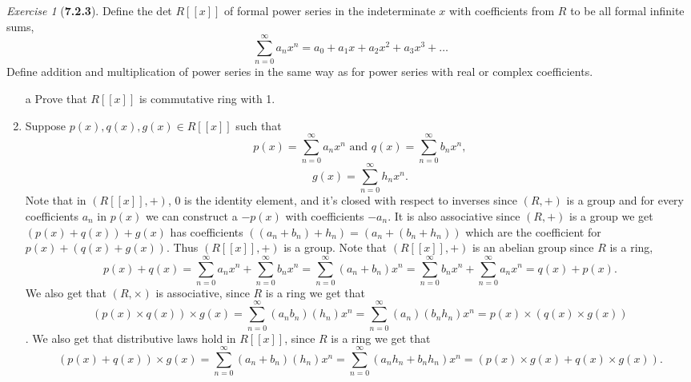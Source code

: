 \documentclass[12pt]{amsart}
\makeatletter
\theoremstyle{remark}
\newtheorem*{exercise}{Exercise}%
\renewenvironment{proof}[1][\proofname]{\par\doublespacing
  \pushQED{\qed}%
  \normalfont \topsep6\p@\@plus6\p@\relax
  \list{}{%
    \settowidth{\leftmargin}{\itshape\proofname:\hskip\labelsep}%
    \setlength{\labelwidth}{0pt}%
    \setlength{\itemindent}{-\leftmargin}%
  }%
  \item[\hskip\labelsep\itshape#1\@addpunct{:}]\ignorespaces
}{%
  \popQED\endlist\@endpefalse
  \singlespacing
}
\theoremstyle{mycomment}
\makeatother
\begin{document}
\begin{exercise}[\textbf{7.2.3}] Define the det $R[[x]]$ of formal power series in the indeterminate $x$ with coefficients from $R$ to be all formal infinite sums, 
  \begin{equation*}
    \sum_{n = 0}^{\infty} a_nx^n = a_0 + a_1x + a_2x^2 + a_3x^3 + \dots
  \end{equation*}
  Define addition and multiplication of power series in the same way as for power series with real or complex coefficients. 
  \begin{enumerate}
    \item[a] Prove that $R[[x]]$ is commutative ring with 1. 
    \begin{proof}
      Suppose $p(x), q(x), g(x) \in R[[x]]$ such that
      \begin{equation*}
        p(x) = \sum_{n = 0}^{\infty}a_nx^n \text{  and  }q(x) = \sum_{n = 0}^{\infty}b_nx^n,
      \end{equation*}
      \begin{equation*}
        g(x) = \sum_{n = 0}^{\infty}h_nx^n.
      \end{equation*}
      Note that in $(R[[x]], +)$, $0$ is the identity element, and it's closed with respect to 
      inverses since $(R, +)$ is a group and for every coefficients $a_n$ in $p(x)$ we can construct a $-p(x)$ with coefficients $-a_n$. It is also associative since $(R, +)$ is a group we get $(p(x) + q(x)) + g(x)$ has coefficients $((a_n + b_n) + h_n) = (a_n + (b_n + h_n))$ which are the coefficient for $p(x) + (q(x) + g(x))$.
      Thus $(R[[x]],+)$ is a group. Note that $(R[[x]], +)$ is an abelian group since $R$ is a ring, 
      \begin{equation*}
        p(x) + q(x) = \sum_{n = 0}^{\infty}a_nx^n + \sum_{n = 0}^{\infty}b_nx^n = \sum_{n = 0}^{\infty}(a_n + b_n)x^n =   \sum_{n = 0}^{\infty}b_nx^n + \sum_{n = 0}^{\infty}a_nx^n = q(x) + p(x). 
      \end{equation*}
      We also get that $(R, \times)$ is associative, since $R$ is a ring we get that 
      \begin{equation*}
        (p(x) \times q(x)) \times g(x) = \sum_{n = 0}^{\infty}(a_nb_n)(h_n)x^n = \sum_{n = 0}^{\infty}(a_n)(b_nh_n)x^n =  p(x) \times (q(x) \times g(x)) 
      \end{equation*}.
      We also get that distributive laws hold in $R[[x]]$, since $R$ is a ring we get that
      \begin{equation*}
        (p(x) + q(x)) \times g(x) = \sum_{n = 0}^{\infty}(a_n+b_n)(h_n)x^n = \sum_{n = 0}^{\infty}(a_nh_n+b_nh_n)x^n = (p(x)\times g(x) + q(x)\times g(x)).

\end{equation*}
\end{proof}
\end{enumerate}
\end{exercise}
\end{document}
